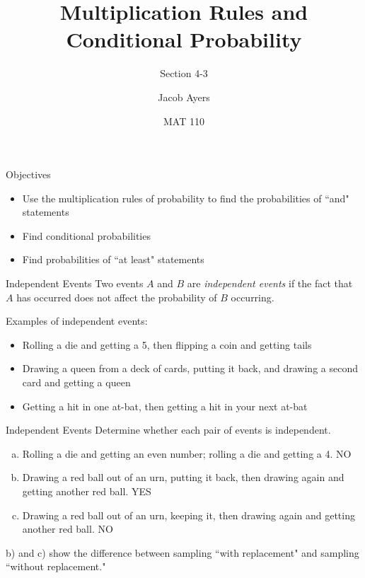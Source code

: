 \documentclass[t, aspectratio=169]{beamer}
\title[4-3]{Multiplication Rules and Conditional Probability}
\subtitle{Section 4-3}
\author{Jacob Ayers}
\institute{Lesson \#11}
\date{MAT 110}
\newcommand{\?}{\stackrel{?}{=}}
\begin{document}
	
	\begin{frame}
		\titlepage
	\end{frame}
	
	\begin{frame}{Objectives}
		\begin{itemize}
			\item Use the multiplication rules of probability to find the probabilities of ``and" statements
			\item Find conditional probabilities
			\item Find probabilities of ``at least" statements
		\end{itemize}
	\end{frame}

	\begin{frame}{Independent Events}
		Two events $A$ and $B$ are \textit{independent events} if the fact that $A$ has occurred does not affect the probability of $B$ occurring. \pause
		
		Examples of independent events: \begin{itemize}
			\item Rolling a die and getting a 5, then flipping a coin and getting tails
			\item Drawing a queen from a deck of cards, putting it back, and drawing a second card and getting a queen
			\item Getting a hit in one at-bat, then getting a hit in your next at-bat
		\end{itemize}
	\end{frame}

	\begin{frame}{Independent Events}
		Determine whether each pair of events is independent. \begin{enumerate}[a)]
			\item Rolling a die and getting an even number; rolling a die and getting a 4. \pause NO \pause
			\item Drawing a red ball out of an urn, putting it back, then drawing again and getting another red ball. \pause YES \pause
			\item Drawing a red ball out of an urn, keeping it, then drawing again and getting another red ball. \pause NO
		\end{enumerate} \pause
	
		b) and c) show the difference between sampling ``with replacement" and sampling ``without replacement."
	\end{frame}
\end{document}
